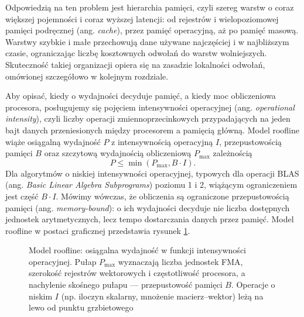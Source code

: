 \documentclass[a4paper,12pt]{book} %
\begin{document}
Odpowiedzią na ten problem jest hierarchia pamięci, czyli szereg warstw o coraz większej pojemności i coraz wyższej latencji: od rejestrów i wielopoziomowej pamięci podręcznej (ang. \emph{cache}), przez pamięć operacyjną, aż po pamięć masową. Warstwy szybkie i małe przechowują dane używane najczęściej i w najbliższym czasie, ograniczając liczbę kosztownych odwołań do warstw wolniejszych. Skuteczność takiej organizacji opiera się na zasadzie lokalności odwołań, omówionej szczegółowo w kolejnym rozdziale.

Aby opisać, kiedy o wydajności decyduje pamięć, a kiedy moc obliczeniowa procesora, posługujemy się pojęciem intensywności operacyjnej (ang. \emph{operational intensity}), czyli liczby operacji zmiennoprzecinkowych przypadających na jeden bajt danych przeniesionych między procesorem a pamięcią główną. Model roofline \cite{williams2009roofline} wiąże osiągalną wydajność $P$ z intensywnością operacyjną $I$, przepustowością pamięci $B$ oraz szczytową wydajnością obliczeniową $P_{\max}$ zależnością
\[
  P \le \min(P_{\max}, B \cdot I).
\]
Dla algorytmów o niskiej intensywności operacyjnej, typowych dla operacji BLAS (ang. \emph{Basic Linear Algebra Subprograms}) poziomu 1 i 2, wiążącym ograniczeniem jest część $B \cdot I$. Mówimy wówczas, że obliczenia są ograniczone przepustowością pamięci (ang. \emph{memory-bound}): o ich wydajności decyduje nie liczba dostępnych jednostek arytmetycznych, lecz tempo dostarczania danych przez pamięć. Model roofline w postaci graficznej przedstawia rysunek \ref{rys:roofline}.

\begin{figure}[t!]
\centering
{}
\caption{Model roofline: osiągalna wydajność w funkcji intensywności operacyjnej. Pułap $P_{\max}$ wyznaczają liczba jednostek FMA, szerokość rejestrów wektorowych i częstotliwość procesora, a nachylenie skośnego pułapu --- przepustowość pamięci $B$. Operacje o niskim $I$ (np. iloczyn skalarny, mnożenie macierz--wektor) leżą na lewo od punktu grzbietowego}
\label{rys:roofline}
\end{figure}
\end{document}
